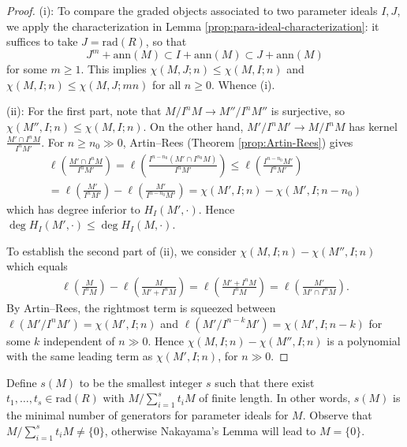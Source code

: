 \begin{proof}
	(i): To compare the graded objects associated to two parameter ideals $I, J$, we apply the characterization in Lemma \ref{prop:para-ideal-characterization}: it suffices to take $J = \mathrm{rad}(R)$, so that
	\[ J^m + \text{ann}(M) \subset I + \text{ann}(M) \subset J + \text{ann}(M) \]
	for some $m \geq 1$. This implies $\chi(M,J; n) \leq \chi(M,I;n)$ and $\chi(M,I;n) \leq \chi(M,J;mn)$ for all $n \geq 0$. Whence (i).

	(ii): For the first part, note that $M/I^n M \to M''/I^n M''$ is surjective, so $\chi(M'', I; n) \leq \chi(M, I; n)$. On the other hand, $M'/I^n M' \to M/I^n M$ has kernel $\frac{M' \cap I^n M}{I^n M'}$. For $n \geq n_0 \gg 0$, Artin--Rees (Theorem \ref{prop:Artin-Rees}) gives
	\begin{multline*}
		\ell\left(\frac{M' \cap I^n M}{I^n M'}\right) = \ell\left(\frac{I^{n - n_0}(M' \cap I^{n_0} M)}{I^n M'}\right) \leq \ell\left(\frac{I^{n - n_0} M'}{I^n M'}\right) \\
		= \ell\left( \frac{M'}{I^n M'} \right) - \ell\left( \frac{M'}{I^{n - n_0} M'}\right) = \chi(M', I; n) - \chi(M', I; n-n_0)
	\end{multline*}
	which has degree inferior to $H_I(M', \cdot)$. Hence $\deg H_I(M', \cdot) \leq \deg H_I(M, \cdot)$.

	To establish the second part of (ii), we consider $\chi(M, I; n) - \chi(M'', I; n)$ which equals
	\begin{gather*}
		\ell\left(\frac{M}{I^n M}\right) - \ell\left( \frac{M}{M' + I^n M} \right) = \ell\left( \frac{M' + I^n M}{I^n M} \right) = \ell\left( \frac{M'}{M' \cap I^n M} \right).
	\end{gather*}
	By Artin--Rees, the rightmost term is squeezed between $\ell(M'/I^n M') = \chi(M',I; n)$ and $\ell( M'/I^{n-k} M') = \chi(M', I; n-k)$ for some $k$ independent of $n \gg 0$. Hence $\chi(M, I; n) - \chi(M'', I; n)$ is a polynomial with the same leading term as $\chi(M', I; n)$, for $n \gg 0$.
\end{proof}

Define $s(M)$ to be the smallest integer $s$ such that there exist $t_1, \ldots, t_s \in \text{rad}(R)$ with $M/\sum_{i=1}^s t_i M$ of finite length. In other words, $s(M)$ is the minimal number of generators for parameter ideals for $M$. Observe that $M/\sum_{i=1}^s t_i M \neq \{0\}$, otherwise Nakayama's Lemma will lead to $M = \{0\}$.

